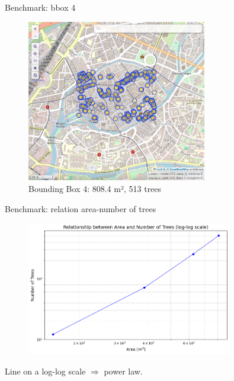 \documentclass[10pt]{beamer}
\begin{document}
\begin{frame}{Benchmark: bbox 4}
  \begin{figure}[H]
    \centering
    \includegraphics[width=0.7\textwidth]{images/bbox4.png}
    \caption{Bounding Box 4: 808.4 m², 513 trees}
\end{figure}
\end{frame}

\begin{frame}{Benchmark: relation area-number of trees}
  \begin{figure}[H]
    \centering
    \includegraphics[width=0.8\textwidth]{images/area_vs_trees.png}
\end{figure}
Line on a log-log scale $\Longrightarrow$ power law.
\end{frame}
\end{document}
